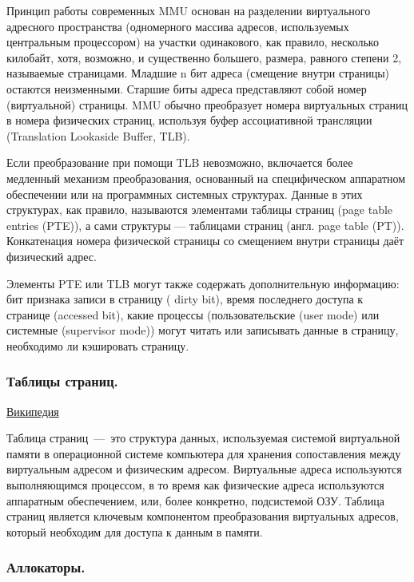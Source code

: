 \documentclass{article}
\begin{document}
Принцип работы современных MMU основан на разделении виртуального адресного пространства (одномерного массива адресов, используемых центральным процессором) на участки одинакового, как правило, несколько килобайт, хотя, возможно, и существенно большего, размера, равного степени 2, называемые страницами. Младшие n бит адреса (смещение внутри страницы) остаются неизменными. Старшие биты адреса представляют собой номер (виртуальной) страницы. MMU обычно преобразует номера виртуальных страниц в номера физических страниц, используя буфер ассоциативной трансляции (Translation Lookaside Buffer, TLB).

Если преобразование при помощи TLB невозможно, включается более медленный механизм преобразования, основанный на специфическом аппаратном обеспечении или на программных системных структурах. Данные в этих структурах, как правило, называются элементами таблицы страниц (page table entries (PTE)), а сами структуры — таблицами страниц (англ. page table (PT)). Конкатенация номера физической страницы со смещением внутри страницы даёт физический адрес.

Элементы PTE или TLB могут также содержать дополнительную информацию: бит признака записи в страницу ( dirty bit), время последнего доступа к странице (accessed bit), какие процессы (пользовательские (user mode) или системные (supervisor mode)) могут читать или записывать данные в страницу, необходимо ли кэшировать страницу.

\subsubsection{Таблицы страниц.}

\href{https://ru.wikipedia.org/wiki/%D0%A2%D0%B0%D0%B1%D0%BB%D0%B8%D1%86%D0%B0_%D1%81%D1%82%D1%80%D0%B0%D0%BD%D0%B8%D1%86}{Википедия}

Таблица страниц~---~это структура данных, используемая системой виртуальной памяти в операционной системе компьютера для хранения сопоставления между виртуальным адресом и физическим адресом. Виртуальные адреса используются выполняющимся процессом, в то время как физические адреса используются аппаратным обеспечением, или, более конкретно, подсистемой ОЗУ. Таблица страниц является ключевым компонентом преобразования виртуальных адресов, который необходим для доступа к данным в памяти.

\subsubsection{Аллокаторы.}
\end{document}
